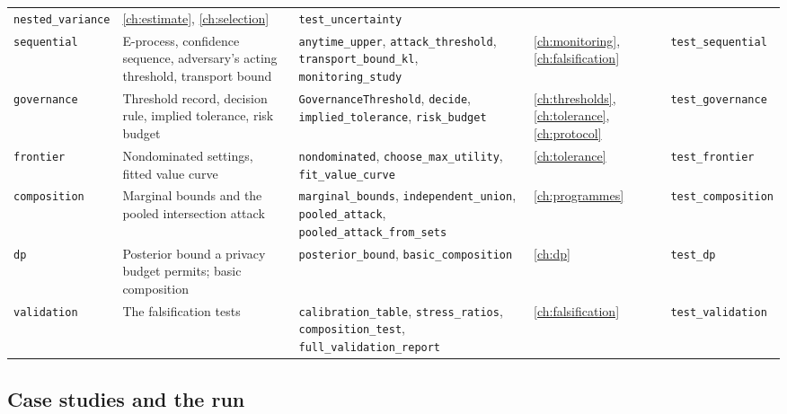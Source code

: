 \begin{table}[ht]
\begin{tabular}{@{}>{\raggedright\arraybackslash}p{2.0cm}>{\raggedright\arraybackslash}p{3.6cm}>{\raggedright\arraybackslash}p{4.1cm}>{\raggedright\arraybackslash}p{1.8cm}>{\raggedright\arraybackslash}p{2.8cm}@{}}
\texttt{nested\_\allowbreak{}variance} & \ref{ch:estimate}, \ref{ch:selection} &
\texttt{test\_\allowbreak{}uncertainty} \\
\texttt{sequential} & E-process, confidence sequence, adversary's acting threshold,
transport bound & \texttt{anytime\_\allowbreak{}upper}, \texttt{attack\_\allowbreak{}threshold},
\texttt{transport\_\allowbreak{}bound\_\allowbreak{}kl}, \texttt{monitoring\_\allowbreak{}study} & \ref{ch:monitoring},
\ref{ch:falsification} & \texttt{test\_\allowbreak{}sequential} \\
\texttt{governance} & Threshold record, decision rule, implied tolerance, risk budget
& \texttt{GovernanceThreshold}, \texttt{decide}, \texttt{implied\_\allowbreak{}tolerance},
\texttt{risk\_\allowbreak{}budget} & \ref{ch:thresholds}, \ref{ch:tolerance}, \ref{ch:protocol} &
\texttt{test\_\allowbreak{}governance} \\
\texttt{frontier} & Nondominated settings, fitted value curve &
\texttt{nondominated}, \texttt{choose\_\allowbreak{}max\_\allowbreak{}utility}, \texttt{fit\_\allowbreak{}value\_\allowbreak{}curve} &
\ref{ch:tolerance} & \texttt{test\_\allowbreak{}frontier} \\
\texttt{composition} & Marginal bounds and the pooled intersection attack &
\texttt{marginal\_\allowbreak{}bounds}, \texttt{independent\_\allowbreak{}union}, \texttt{pooled\_\allowbreak{}attack},
\texttt{pooled\_\allowbreak{}attack\_\allowbreak{}from\_\allowbreak{}sets} & \ref{ch:programmes} &
\texttt{test\_\allowbreak{}composition} \\
\texttt{dp} & Posterior bound a privacy budget permits; basic composition &
\texttt{posterior\_\allowbreak{}bound}, \texttt{basic\_\allowbreak{}composition} & \ref{ch:dp} &
\texttt{test\_\allowbreak{}dp} \\
\texttt{validation} & The falsification tests & \texttt{calibration\_\allowbreak{}table},
\texttt{stress\_\allowbreak{}ratios}, \texttt{composition\_\allowbreak{}test},
\texttt{full\_\allowbreak{}validation\_\allowbreak{}report} & \ref{ch:falsification} &
\texttt{test\_\allowbreak{}validation} \\
\bottomrule
\end{tabular}
\end{table}

\subsection*{Case studies and the run}

